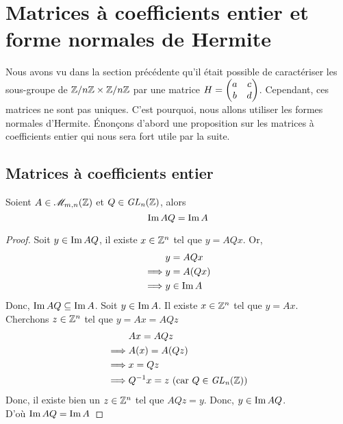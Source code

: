 \documentclass[12pt]{article}
\newcommand{\ZnZ}{\Z/n\Z}
\newcommand{\ZZ}{\ZnZ \x \ZnZ}
\begin{document}
\newpage
\section{Matrices à coefficients entier et forme normales de Hermite}
Nous avons vu dans la section précédente qu'il était possible de caractériser les sous-groupe de
$\ZZ$ par une matrice $H = \begin{pmatrix} a & c\\ b & d \end{pmatrix}$. Cependant, ces matrices ne sont pas uniques. C'est
pourquoi, nous allons utiliser les formes normales d'Hermite.
Énonçons d'abord une proposition sur les matrices à coefficients entier qui nous sera fort
utile par la suite.

\subsection{Matrices à coefficients entier}
\begin{proposition}\label{ima_imaq}
	Soient $A \in \mathscr{M}_{m,n}(\mathbb Z)$ et $Q \in \it {GL}_n(\mathbb Z)$, alors
	$$\operatorname{Im} AQ = \operatorname{Im} A$$
\end{proposition}
\begin{proof}
	Soit $y \in \operatorname{Im} AQ$, il existe $x \in \mathbb Z^n$ tel que $y = AQx$. Or,
	\begin{align*}
		         & y = AQx     \\
		\implies & y = A(Qx)   \\
		\implies & y \in \operatorname{Im} A
	\end{align*}
	Donc, $\operatorname{Im} AQ \subseteq \operatorname{Im} A$.
	Soit $y \in \operatorname{Im} A$. Il existe $x \in \mathbb Z^n$ tel que $y = Ax$.\\
	Cherchons $z \in \mathbb Z^n$ tel que $y = Ax = AQz$
	\begin{align*}
		         & Ax = AQz                                     \\
		\implies & A(x) = A(Qz)                                 \\
		\implies & x = Qz                                       \\
		\implies & Q^{-1} x = z \text{ (car $Q \in \it {GL}_n(\mathbb Z)$)}
	\end{align*}
	Donc, il existe bien un $z \in \mathbb Z^n$ tel que $AQz = y$. Donc, $y \in \operatorname{Im} AQ$.\\
	D'où $\operatorname{Im} AQ = \operatorname{Im} A$

\end{proof}

\newpage
\end{document}
